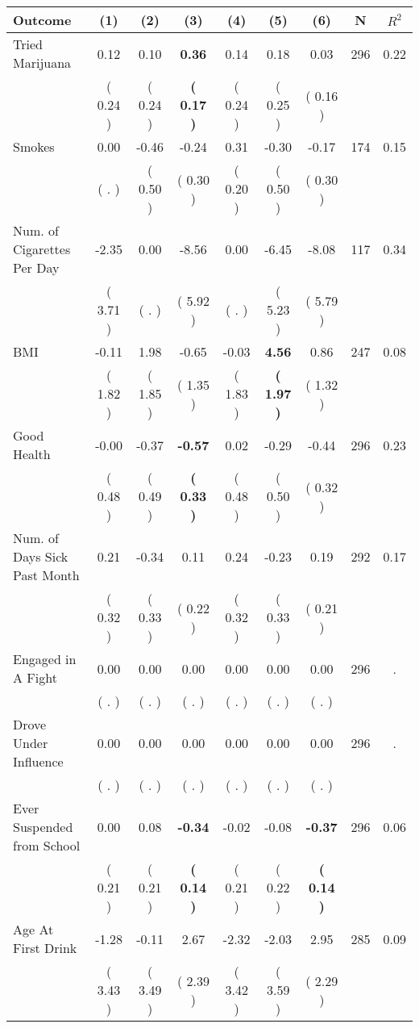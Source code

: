 \begin{tabular}{lcccccccc}
\toprule
 \textbf{Outcome} & \textbf{(1)} & \textbf{(2)} & \textbf{(3)} & \textbf{(4)} & \textbf{(5)} & \textbf{(6)} & \textbf{N} & \textbf{$ R^2$} \\
\midrule
Tried Marijuana &      0.12 &      0.10 & \textbf{     0.36} &      0.14 &      0.18 &      0.03 & 296 &       0.22 \\ 
 & (     0.24 ) & (     0.24 ) & \textbf{(     0.17 )} & (     0.24 ) & (     0.25 ) & (     0.16 ) & \\
Smokes &      0.00 &     -0.46 &     -0.24 &      0.31 &     -0.30 &     -0.17 & 174 &       0.15 \\ 
 & (        . ) & (     0.50 ) & (     0.30 ) & (     0.20 ) & (     0.50 ) & (     0.30 ) & \\
Num. of Cigarettes Per Day &     -2.35 &      0.00 &     -8.56 &      0.00 &     -6.45 &     -8.08 & 117 &       0.34 \\ 
 & (     3.71 ) & (        . ) & (     5.92 ) & (        . ) & (     5.23 ) & (     5.79 ) & \\
BMI &     -0.11 &      1.98 &     -0.65 &     -0.03 & \textbf{     4.56} &      0.86 & 247 &       0.08 \\ 
 & (     1.82 ) & (     1.85 ) & (     1.35 ) & (     1.83 ) & \textbf{(     1.97 )} & (     1.32 ) & \\
Good Health &     -0.00 &     -0.37 & \textbf{    -0.57} &      0.02 &     -0.29 &     -0.44 & 296 &       0.23 \\ 
 & (     0.48 ) & (     0.49 ) & \textbf{(     0.33 )} & (     0.48 ) & (     0.50 ) & (     0.32 ) & \\
Num. of Days Sick Past Month &      0.21 &     -0.34 &      0.11 &      0.24 &     -0.23 &      0.19 & 292 &       0.17 \\ 
 & (     0.32 ) & (     0.33 ) & (     0.22 ) & (     0.32 ) & (     0.33 ) & (     0.21 ) & \\
Engaged in A Fight &      0.00 &      0.00 &      0.00 &      0.00 &      0.00 &      0.00 & 296 &          . \\ 
 & (        . ) & (        . ) & (        . ) & (        . ) & (        . ) & (        . ) & \\
Drove Under Influence &      0.00 &      0.00 &      0.00 &      0.00 &      0.00 &      0.00 & 296 &          . \\ 
 & (        . ) & (        . ) & (        . ) & (        . ) & (        . ) & (        . ) & \\
Ever Suspended from School &      0.00 &      0.08 & \textbf{    -0.34} &     -0.02 &     -0.08 & \textbf{    -0.37} & 296 &       0.06 \\ 
 & (     0.21 ) & (     0.21 ) & \textbf{(     0.14 )} & (     0.21 ) & (     0.22 ) & \textbf{(     0.14 )} & \\
Age At First Drink &     -1.28 &     -0.11 &      2.67 &     -2.32 &     -2.03 &      2.95 & 285 &       0.09 \\ 
 & (     3.43 ) & (     3.49 ) & (     2.39 ) & (     3.42 ) & (     3.59 ) & (     2.29 ) & \\
\bottomrule
\end{tabular}
